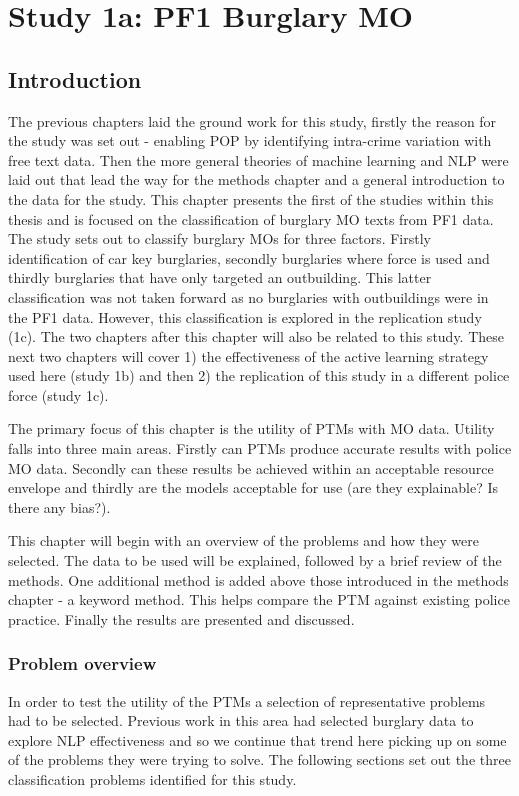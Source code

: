\chapter{Study 1a: PF1 Burglary MO}
\section{Introduction}

The previous chapters laid the ground work for this study, firstly the reason for the study was set out -  enabling POP by identifying intra-crime variation with free text data. Then the more general theories of machine learning and NLP were laid out that lead the way for the methods chapter and a general introduction to the data for the study. This chapter presents the first of the studies within this thesis and is focused on the classification of burglary MO texts from PF1 data. The study sets out to classify burglary MOs for three factors. Firstly identification of car key burglaries, secondly burglaries where force is used and thirdly burglaries that have only targeted an outbuilding. This latter classification was not taken forward as no burglaries with outbuildings were in the PF1 data. However, this classification is explored in the replication study (1c). The two chapters after this chapter will also be related to this study. These next two chapters will cover 1) the effectiveness of the active learning strategy used here (study 1b)  and then 2) the replication of this study in a different police force (study 1c).      

The primary focus of this chapter is the utility of PTMs with MO data. Utility falls into three main areas. Firstly can PTMs produce accurate results with police MO data. Secondly can these results be achieved within an acceptable resource envelope and thirdly are the models acceptable for use (are they explainable? Is there any bias?). 

This chapter will begin with an overview of the problems and how they were selected. The data to be used will be explained, followed by a brief review of the methods. One additional method is added above those introduced in the methods chapter - a keyword method. This helps compare the PTM against existing police practice. Finally the results are presented and discussed.

\subsection{Problem overview} In order to test the utility of the PTMs a selection of representative problems had to be selected. Previous work in this area had selected burglary data \parencite{birks, sheard2020developing } to explore NLP effectiveness and so we continue that trend here picking up on some of the problems they were trying to solve. The following sections set out the three classification problems identified for this study. 

